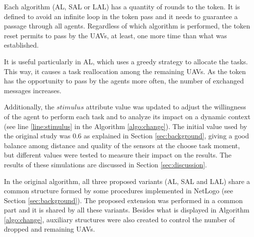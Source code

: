 Each algorithm (AL, SAL or LAL) has a quantity of rounds to the token. It is defined to avoid an infinite loop in the token pass and it needs to guarantee a passage through all agents. Regardless of which algorithm is performed, the token reset permits to pass by the UAVs, at least, one more time than what was established. 

It is useful particularly in AL, which uses a greedy strategy to allocate the tasks. This way, it causes a task reallocation among the remaining UAVs. As the token has the opportunity to pass by the agents more often, the number of exchanged messages increases.

Additionally, the $stimulus$ attribute value was updated to adjust the willingness of the agent to perform each task and to analyze its impact on a dynamic context (see line \ref{line:stimulus} in the Algorithm \ref{algo:change}). The initial value used by the original study was $0.6$ as explained in Section \ref{sec:background}, giving a good balance among distance and quality of the sensors at the choose task moment, but different values were tested to measure their impact on the results. The results of these simulations are discussed in Section \ref{sec:discussion}. 

In the original algorithm, all three proposed variants (AL, SAL and LAL) share a common structure formed by some procedures implemented in NetLogo (see Section \ref{sec:background}). The proposed extension was performed in a common part and it is shared by all these variants. Besides what is displayed in Algorithm \ref{algo:change}, auxiliary structures were also created to control the number of dropped and remaining UAVs.
